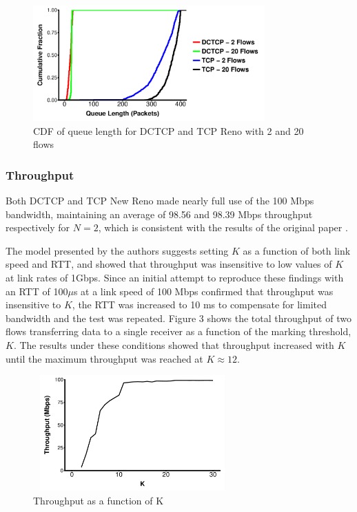\begin{figure}
\includegraphics[height=1.75in,width=3.5in]{queue_cdf}
\caption{CDF of queue length for DCTCP and TCP Reno with 2 and 20 flows}
\end{figure}

\subsubsection{Throughput}

 Both DCTCP and TCP New Reno made nearly full use of the 100 Mbps bandwidth, maintaining an average of 98.56 and 98.39 Mbps throughput respectively for $N = 2$, which is consistent with the results of the original paper \cite{alizadeh_data_2010}.

The model presented by the authors suggests setting $K$ as a function of both link speed and RTT, and showed that throughput was insensitive to low values of $K$ at link rates of 1Gbps. Since an initial attempt to reproduce these findings with an RTT of 100$\mu$s at a link speed of 100 Mbps confirmed that throughput was insensitive to $K$, the RTT was increased to 10 ms to compensate for limited bandwidth and the test was repeated. Figure 3 shows the total throughput of two flows transferring data to a single receiver as a function of the marking threshold, $K$. The results under these conditions showed that throughput increased with $K$ until the maximum throughput was reached at $K \approx 12$. 

\begin{figure}
\includegraphics[height=1.75in,width=3in]{k_throughput_delay}
\caption{Throughput as a function of K}
\end{figure}

